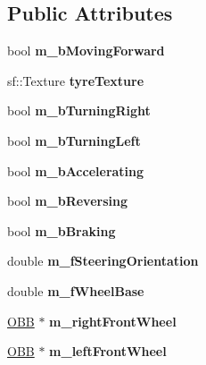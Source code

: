 \subsection*{Public Attributes}
\begin{DoxyCompactItemize}
\item 
\hypertarget{class_car_a7f45340643c43ddd543d96662fe88911}{}bool {\bfseries m\+\_\+b\+Moving\+Forward}\label{class_car_a7f45340643c43ddd543d96662fe88911}

\item 
\hypertarget{class_car_a983d81f940c2a10f6b7657a27ad89a48}{}sf\+::\+Texture {\bfseries tyre\+Texture}\label{class_car_a983d81f940c2a10f6b7657a27ad89a48}

\item 
\hypertarget{class_car_a1caa04bed661507cc92dcc465374aa40}{}bool {\bfseries m\+\_\+b\+Turning\+Right}\label{class_car_a1caa04bed661507cc92dcc465374aa40}

\item 
\hypertarget{class_car_ab15cb88a73253d2d258368bed12be6cc}{}bool {\bfseries m\+\_\+b\+Turning\+Left}\label{class_car_ab15cb88a73253d2d258368bed12be6cc}

\item 
\hypertarget{class_car_a3ca299e37b7a2b964e68877e7fc41d56}{}bool {\bfseries m\+\_\+b\+Accelerating}\label{class_car_a3ca299e37b7a2b964e68877e7fc41d56}

\item 
\hypertarget{class_car_a8a5ba2979820d7c0f2a00571fd7755de}{}bool {\bfseries m\+\_\+b\+Reversing}\label{class_car_a8a5ba2979820d7c0f2a00571fd7755de}

\item 
\hypertarget{class_car_a0a5b2769f8000bc41da5ffacaff488bd}{}bool {\bfseries m\+\_\+b\+Braking}\label{class_car_a0a5b2769f8000bc41da5ffacaff488bd}

\item 
\hypertarget{class_car_af67de6d3bb5203272670314409bd3ca8}{}double {\bfseries m\+\_\+f\+Steering\+Orientation}\label{class_car_af67de6d3bb5203272670314409bd3ca8}

\item 
\hypertarget{class_car_a7be779b298ee9803e8189e08f0cafc27}{}double {\bfseries m\+\_\+f\+Wheel\+Base}\label{class_car_a7be779b298ee9803e8189e08f0cafc27}

\item 
\hypertarget{class_car_aeee6d1517b9a5e209c06a2bcd5ff4041}{}\hyperlink{class_o_b_b}{O\+B\+B} $\ast$ {\bfseries m\+\_\+right\+Front\+Wheel}\label{class_car_aeee6d1517b9a5e209c06a2bcd5ff4041}

\item 
\hypertarget{class_car_a2ab8adbfc7ae82ff7552acf47e75fd55}{}\hyperlink{class_o_b_b}{O\+B\+B} $\ast$ {\bfseries m\+\_\+left\+Front\+Wheel}\label{class_car_a2ab8adbfc7ae82ff7552acf47e75fd55}

\end{DoxyCompactItemize}
